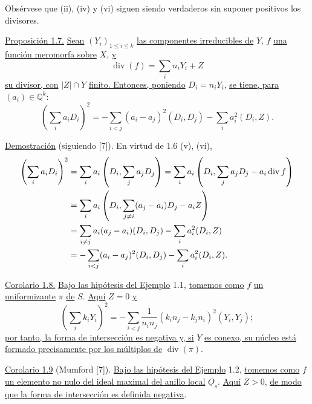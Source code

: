 Obsérvese que (ii), (iv) y (vi) siguen siendo verdaderos sin suponer positivos
los divisores.

\pageoriginale

\medskip
\noindent\underline{Proposición 1.7.}
\underline{Sean} $(Y_i)_{1\leq i\leq k}$ \underline{las componentes
irreducibles de} $Y$, $f$ \underline{una función meromorfa sobre} $X$,
\underline{y}
\begin{equation*}
\operatorname{div}(f)=\sum_i n_iY_i+Z
\end{equation*}
\underline{su divisor, con} $|Z|\cap Y$ \underline{finito. Entonces, poniendo}
$D_i=n_iY_i$, \underline{se tiene, para} $(a_i)\in\mathbb Q^k$:
\begin{equation*}
\left(\sum_i a_iD_i\right)^2
=-\sum_{i<j}(a_i-a_j)^2(D_i,D_j)-\sum_i a_i^2(D_i,Z).
\end{equation*}

\medskip
\noindent\underline{Demostración} (siguiendo [7]).
En virtud de 1.6 (v), (vi),
\begin{equation*}
\begin{aligned}
\left(\sum_i a_iD_i\right)^2
&=\sum_i a_i\left(D_i,\sum_j a_jD_j\right)
=\sum_i a_i\left(D_i,\sum_j a_jD_j-a_i\operatorname{div}f\right)\\
&=\sum_i a_i\left(D_i,\sum_{j\ne i}(a_j-a_i)D_j-a_iZ\right)\\
&=\sum_{i\ne j}a_i(a_j-a_i)(D_i,D_j)-\sum_i a_i^2(D_i,Z)\\
&=-\sum_{i<j}(a_i-a_j)^2\sisi{(D_i\ D_j)}{(D_i,D_j)}-\sum_i a_i^2(D_i,Z).
\end{aligned}
\end{equation*}

\medskip
\noindent\underline{Corolario 1.8.}
\underline{Bajo las hipótesis del Ejemplo} 1.1, \underline{tomemos como} $f$
\underline{un uniformizante} $\pi$ \underline{de} $S$. \underline{Aquí}
$Z=0$ \underline{y}
\begin{equation*}
\left(\sum_i k_iY_i\right)^2
=-\sum_{i<j}\frac{1}{n_in_j}(k_in_j-k_jn_i)^2(Y_i,Y_j);
\end{equation*}
\underline{por tanto, la forma de intersección es negativa y, si} $Y$
\underline{es conexo, su núcleo está formado precisamente por los múltiplos de}
$\operatorname{div}(\pi)$.

\medskip
\noindent\underline{Corolario 1.9} (Mumford [7]).
\underline{Bajo las hipótesis del Ejemplo} 1.2, \underline{tomemos como} $f$
\underline{un elemento no nulo del ideal maximal del anillo local}
$\underline O_s$. \underline{Aquí} $Z>0$, \underline{de modo que la forma de
intersección es definida negativa}.

